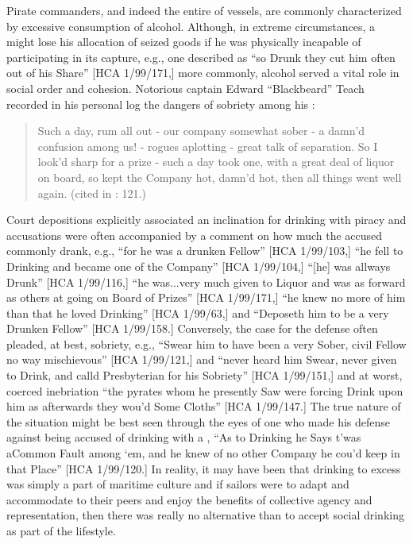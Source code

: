 Pirate commanders, and indeed the entire  of  vessels, are commonly characterized by excessive consumption of alcohol. Although, in extreme circumstances, a  might lose his allocation of seized goods if he was physically incapable of participating in its capture, e.g., one  described as “so Drunk they cut him often out of his Share” [HCA 1/99/171,] more commonly, alcohol served a vital role in social order and cohesion. Notorious  captain Edward “Blackbeard” Teach recorded in his personal log the dangers of sobriety among his :

\begin{quotation}
Such a day, rum all out - our company somewhat sober - a damn’d confusion among us! - rogues aplotting - great talk of separation. So I look’d sharp for a prize - such a day took one, with a great deal of liquor on board, so kept the Company hot, damn’d hot, then all things went well again. (cited in \citealt{Bicheno2012}: 121.)
\end{quotation}

Court depositions explicitly associated an inclination for drinking with piracy and accusations were often accompanied by a comment on how much the accused commonly drank, e.g., “for he was a drunken Fellow” [HCA 1/99/103,] “he fell to Drinking and became one of the Company” [HCA 1/99/104,] “[he] was allways Drunk” [HCA 1/99/116,] “he was...very much given to Liquor and was as forward as others at going on Board of Prizes” [HCA 1/99/171,] “he knew no more of him than that he loved Drinking” [HCA 1/99/63,] and “Deposeth him to be a very Drunken Fellow” [HCA 1/99/158.] Conversely, the case for the defense often pleaded, at best, sobriety, e.g., “Swear him to have been a very Sober, civil Fellow no way mischievous” [HCA 1/99/121,] and “never heard him Swear, never given to Drink, and calld Presbyterian for his Sobriety” [HCA 1/99/151,] and at worst, coerced inebriation “the pyrates whom he presently Saw were forcing Drink upon him as afterwards they wou’d Some Cloths” [HCA 1/99/147.] The true nature of the situation might be best seen through the eyes of one  who made his defense against being accused of drinking with a  , “As to Drinking he Says t’was aCommon Fault among ‘em, and he knew of no other Company he cou’d keep in that Place” [HCA 1/99/120.] In reality, it may have been that drinking to excess was simply a part of maritime culture and if sailors were to adapt and accommodate to their peers and enjoy the benefits of collective agency and representation, then there was really no alternative than to accept social drinking as part of the lifestyle.  

